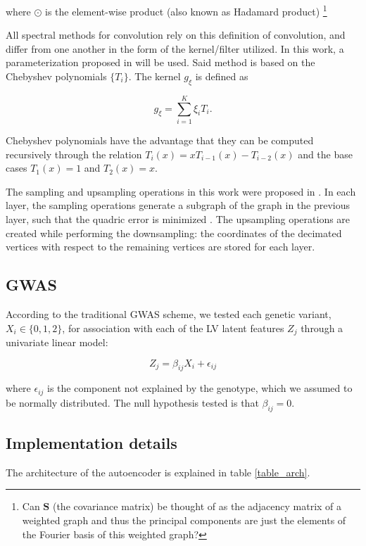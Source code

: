\documentclass[twocolumn]{llncs}
\begin{document}
\noindent where $\odot$ is the element-wise product (also known as Hadamard product)
\footnote{Can $\textbf{S}$ (the covariance matrix) be thought of as the adjacency matrix of a weighted graph and thus the principal components are just the elements of the Fourier basis of this weighted graph?}

All spectral methods for convolution rely on this definition of convolution, and differ from one another in the form of the kernel/filter utilized. In this work, a parameterization proposed in \cite{ref_spectral_graph_conv} will be used. 
Said method is based on the Chebyshev polynomials $\{T_i\}$. The kernel $g_\xi$ is defined as

\begin{equation}
g_{\xi}=\sum_{i=1}^{K}\xi_i T_i.
\end{equation}

Chebyshev polynomials have the advantage that they can be computed recursively through the relation $T_i(x)=xT_{i-1}(x)-T_{i-2}(x)$ and the base cases $T_1(x)=1$ and $T_2(x)=x$.

The sampling and upsampling operations in this work were proposed in \cite{ref_coma}. In each layer, the sampling operations generate a subgraph of the graph in the previous layer, such that the quadric error is minimized \cite{ref_quadric_error}. The upsampling operations are created while performing the downsampling: the coordinates of the decimated vertices with respect to the remaining vertices are stored for each layer.

\subsection{GWAS}
According to the traditional GWAS scheme, we tested each genetic variant, $X_i\in\{0,1,2\}$, for association with each of the LV latent features $Z_j$ through a univariate linear model:

\begin{equation}
Z_j = \beta_{ij}X_i+\epsilon_{ij}
\end{equation}

\noindent where $\epsilon_{ij}$ is the component not explained by the genotype, which we assumed to be normally distributed. The null hypothesis tested is that $\beta_{ij}=0$.

\subsection{Implementation details}
The architecture of the autoencoder is explained in table \ref{table_arch}.
\end{document}
